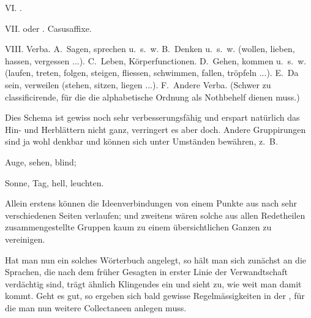 VI. .

VII.  oder . Casusaffixe.

VIII. Verba. A.~Sagen, sprechen u.~s.~w. B.~Denken u.~s.~w. (wollen, lieben, hassen, vergessen ...). C.~Leben, Körperfunctionen. D.~Gehen, kommen u.~s.~w. (laufen, treten, folgen, steigen, fliessen, schwimmen, fallen, tröpfeln ...). E.~Da sein, verweilen (stehen, sitzen, liegen ...). F.~Andere Verba. (Schwer zu classificirende, für die die alphabetische Ordnung als Nothbehelf dienen muss.)

Dies Schema ist gewiss noch sehr verbesserungsfähig und erspart natürlich das Hin- und Herblättern nicht ganz, verringert es aber doch. Andere Gruppirungen sind ja wohl denkbar und können sich unter Umständen bewähren, z.~B. 

Auge, sehen, blind;

Sonne, Tag, hell, leuchten.

Allein erstens können die Ideenverbindungen von einem Punkte aus nach sehr verschiedenen Seiten verlaufen; und zweitens wären solche aus allen Redetheilen zusammengestellte Gruppen kaum zu einem übersichtlichen Ganzen zu vereinigen.

Hat man nun ein solches Wörterbuch angelegt, so hält man sich \label{fp.179} zunächst an die Sprachen, die nach dem früher Gesagten in erster Linie der Verwandtschaft verdächtig sind, trägt ähnlich Klingendes ein und sieht zu, wie weit man damit kommt. Geht es gut, so ergeben sich bald gewisse Regelmässigkeiten in der , für die man nun weitere Collectaneen anlegen muss.

